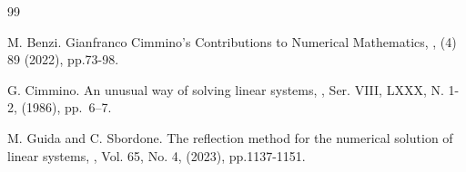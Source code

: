 \documentclass[12pt]{article}
\begin{document}
\begin{thebibliography}{99}

M. Benzi. \newblock  Gianfranco Cimmino's Contributions to Numerical Mathematics, , (4) 89 (2022), pp.73-98.

G. Cimmino. \newblock  An unusual way of solving linear systems, , Ser. VIII, LXXX, N. 1-2, (1986), pp.~6--7.

M. Guida and C. Sbordone. \newblock  The reflection method for the numerical solution of linear systems, ,  Vol. 65, No. 4, (2023), pp.1137-1151.

\end{thebibliography}
\end{document}

